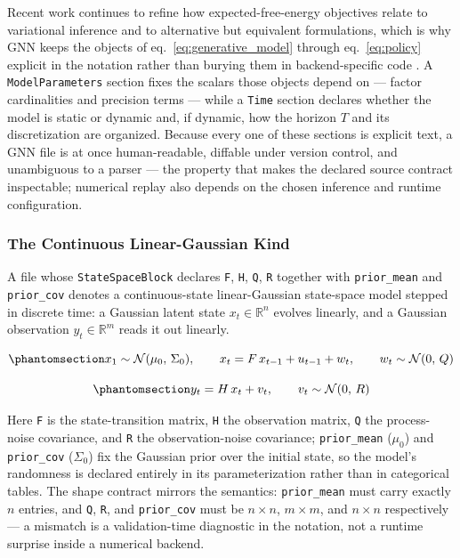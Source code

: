 \documentclass[
  english,
  9pt,
]{extarticle}
\begin{document}
Recent work continues to refine how expected-free-energy objectives
relate to variational inference and to alternative but equivalent
formulations, which is why GNN keeps the objects of
eq.~\ref{eq:generative_model} through eq.~\ref{eq:policy} explicit in
the notation rather than burying them in backend-specific code
\citep{champion2024reframingEfe, nuijten2026typeInference, nuijten2026efePlanningVariational}.
A \texttt{ModelParameters} section fixes the scalars those objects
depend on --- factor cardinalities and precision terms --- while a
\texttt{Time} section declares whether the model is static or dynamic
and, if dynamic, how the horizon \(T\) and its discretization are
organized. Because every one of these sections is explicit text, a GNN
file is at once human-readable, diffable under version control, and
unambiguous to a parser --- the property that makes the declared source
contract inspectable; numerical replay also depends on the chosen
inference and runtime configuration.

\subsubsection{The Continuous Linear-Gaussian
Kind}\label{the-continuous-linear-gaussian-kind}

A file whose \texttt{StateSpaceBlock} declares \texttt{F}, \texttt{H},
\texttt{Q}, \texttt{R} together with \texttt{prior\_mean} and
\texttt{prior\_cov} denotes a continuous-state linear-Gaussian
state-space model stepped in discrete time: a Gaussian latent state
\(x_t \in \mathbb{R}^n\) evolves linearly, and a Gaussian observation
\(y_t \in \mathbb{R}^m\) reads it out linearly.

\begin{equation}\protect\phantomsection\label{eq:lgssm_state}{
x_1 \sim \mathcal{N}(\mu_0,\, \Sigma_0), \qquad x_t = F\, x_{t-1} + u_{t-1} + w_t, \qquad w_t \sim \mathcal{N}(0,\, Q)
}\end{equation}

\begin{equation}\protect\phantomsection\label{eq:lgssm_obs}{
y_t = H\, x_t + v_t, \qquad v_t \sim \mathcal{N}(0,\, R)
}\end{equation}

Here \texttt{F} is the state-transition matrix, \texttt{H} the
observation matrix, \texttt{Q} the process-noise covariance, and
\texttt{R} the observation-noise covariance; \texttt{prior\_mean}
(\(\mu_0\)) and \texttt{prior\_cov} (\(\Sigma_0\)) fix the Gaussian
prior over the initial state, so the model's randomness is declared
entirely in its parameterization rather than in categorical tables. The
shape contract mirrors the semantics: \texttt{prior\_mean} must carry
exactly \(n\) entries, and \texttt{Q}, \texttt{R}, and
\texttt{prior\_cov} must be \(n \times n\), \(m \times m\), and
\(n \times n\) respectively --- a mismatch is a validation-time
diagnostic in the notation, not a runtime surprise inside a numerical
backend.
\end{document}

